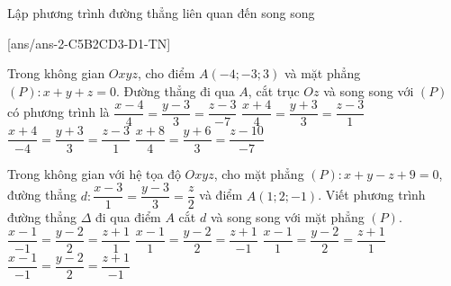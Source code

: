 \begin{dang}{Lập phương trình đường thẳng liên quan đến song song}
\end{dang}
\TN
{}[ans/ans-2-C5B2CD3-D1-TN]
\begin{ex}%
	Trong không gian $Oxyz$, cho điểm $A(-4;-3;3)$ và mặt phẳng $(P)\colon x+y+z=0$. Đường thẳng đi qua $A$, cắt trục $Oz$ và song song với $(P)$ có phương trình là
	\choice
	{$\dfrac{x-4}{4}=\dfrac{y-3}{3}=\dfrac{z-3}{-7}$}
	{$\dfrac{x+4}{4}=\dfrac{y+3}{3}=\dfrac{z-3}{1}$}
	{$\dfrac{x+4}{-4}=\dfrac{y+3}{3}=\dfrac{z-3}{1}$}
	{\True $\dfrac{x+8}{4}=\dfrac{y+6}{3}=\dfrac{z-10}{-7}$}
\end{ex}	
\begin{ex}%
	Trong không gian với hệ tọa độ $Oxyz$, cho mặt phẳng $(P)\colon x+y-z+9=0$, đường thẳng $d\colon \dfrac{x-3}{1}=\dfrac{y-3}{3}=\dfrac{z}{2}$ và điểm $A(1;2;-1)$. Viết phương trình đường thẳng $\Delta$ đi qua điểm $A$ cắt $d$ và song song với mặt phẳng $(P)$.
	\choice
	{\True $\dfrac{x-1}{-1}=\dfrac{y-2}{2}=\dfrac{z+1}{1}$}
	{$\dfrac{x-1}{1}=\dfrac{y-2}{2}=\dfrac{z+1}{-1}$}
	{$\dfrac{x-1}{1}=\dfrac{y-2}{2}=\dfrac{z+1}{1}$}
	{$\dfrac{x-1}{-1}=\dfrac{y-2}{2}=\dfrac{z+1}{-1}$}
\end{ex}
